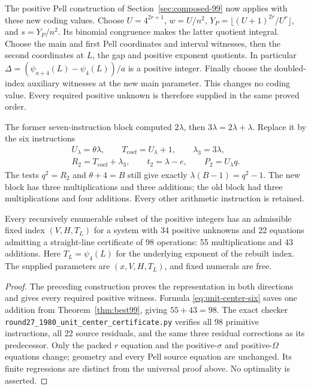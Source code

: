 The positive Pell construction of Section~\ref{sec:composed-99}
now applies with these new coding values. Choose $U=4^{2r+1}$,
$w=U/n^2$, $Y_P=\lfloor(U+1)^{2r}/U^r\rfloor$, and $s=Y_P/n^2$.
Its binomial congruence makes the latter quotient integral.
Choose the main and first Pell coordinates and interval witnesses,
then the second coordinates at $L$, the gap and positive exponent
quotients. In particular
$\Delta=(\psi_{a+4}(L)-\psi_4(L))/a$ is a positive integer.
Finally choose the doubled-index auxiliary witnesses at the new
main parameter. This changes no coding value. Every required
positive unknown is therefore supplied in the same proved order.

The former seven-instruction block computed $2\lambda$, then
$3\lambda=2\lambda+\lambda$. Replace it by the six instructions
\begin{equation}\label{eq:unit-center-six}
 \begin{gathered}
 U_\lambda=\theta\lambda,\qquad
 T_{\mathrm{coef}}=U_\lambda+1,\qquad \lambda_3=3\lambda,\\
 R_2=T_{\mathrm{coef}}+\lambda_3,\qquad
 t_2=\lambda-e,\qquad P_2=U_\lambda q.
 \end{gathered}
\end{equation}
The tests $q^2=R_2$ and $\theta+4=B$ still give exactly
$\lambda(B-1)=q^2-1$. The new block has three multiplications and
three additions; the old block had three multiplications and four
additions. Every other arithmetic instruction is retained.

\begin{theorem}\label{thm:best98}
Every recursively enumerable subset of the positive integers has an
admissible fixed index $(V,H,T_L)$ for a system with 34 positive
unknowns and 22 equations admitting a straight-line certificate of
98 operations: 55 multiplications and 43 additions. Here
$T_L=\psi_4(L)$ for the underlying exponent of the rebuilt index.
The supplied parameters are $(x,V,H,T_L)$, and fixed numerals are free.
\end{theorem}
\begin{proof}
The preceding construction proves the representation in both
directions and gives every required positive witness. Formula
\eqref{eq:unit-center-six} saves one addition from
Theorem~\ref{thm:best99}, giving $55+43=98$.
The exact checker
\texttt{round27\_1980\_unit\_center\_certificate.py} verifies all
98 primitive instructions, all 22 source residuals, and the same
three residual corrections as its predecessor. Only the packed
$r$ equation and the positive-$\sigma$ and positive-$\Omega$
equations change; geometry and every Pell source equation are
unchanged. Its finite regressions are distinct from the universal
proof above. No optimality is asserted.
\end{proof}
